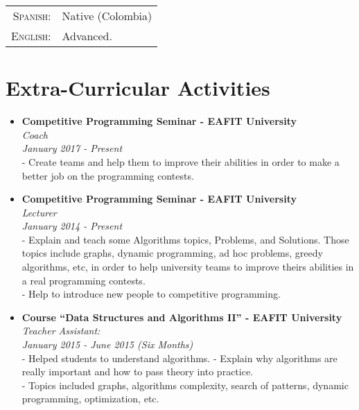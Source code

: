 \documentclass[a4paper,11pt]{article} %
\begin{document}
\begin{tabular}{rl}
\textsc{Spanish:} & Native (Colombia)\\
\textsc{English:} & Advanced.\\
\end{tabular}


\section{Extra-Curricular Activities}
\begin{itemize}
\item \textbf{Competitive Programming Seminar - EAFIT University}\\
\textit{Coach}\\
\textit{January 2017 - Present}\\
- Create teams and help them to improve their abilities in order to make a better job on the programming contests.\\
\item \textbf{Competitive Programming Seminar - EAFIT University}\\
\textit{Lecturer}\\
\textit{January 2014 - Present}\\
- Explain and teach some Algorithms topics, Problems, and Solutions. Those topics include graphs, dynamic programming, ad hoc problems, greedy algorithms, etc, in order to help university teams to improve theirs abilities in a real programming contests.\\
- Help to introduce new people to competitive programming.
\item \textbf{Course ``Data Structures and Algorithms II'' - EAFIT University}\\
\textit{Teacher Assistant:}\\
\textit{January 2015 - June 2015 (Six Months)}\\
- Helped students to understand algorithms.
- Explain why algorithms are really important and how to pass theory into practice.\\
- Topics included graphs, algorithms complexity, search of patterns, dynamic programming, optimization, etc.\\
\end{itemize}
\end{document}
